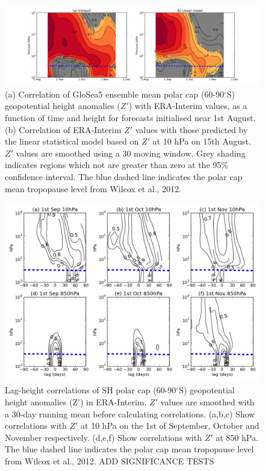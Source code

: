\begin{figure}[htbp]
\centering
\includegraphics{./figures/glosea_linear_corr.png}
\caption{(a) Correlation of GloSea5 ensemble mean polar cap
(60-90$^{\circ}$S) geopotential height anomalies ($Z'$) with ERA-Interim
values, as a function of time and height for forecasts initialised near
1st August. (b) Correlation of ERA-Interim $Z'$ values with those
predicted by the linear statistical model based on $Z'$ at 10 hPa on
15th August. $Z'$ values are smoothed using a 30 moving window. Grey
shading indicates regions which not are greater than zero at the 95\%
confidence interval. The blue dashed line indicates the polar cap mean
tropopause level from Wilcox et al., 2012.}
\end{figure}

\begin{figure}[htbp]
\centering
\includegraphics{./figures/lag_corrs_SH_10hPa.png}
\caption{Lag-height correlations of SH polar cap (60-90$^{\circ}$S)
geopotential height anomalies (Z') in ERA-Interim. $Z'$ values are
smoothed with a 30-day running mean before calculating correlations.
(a,b,c) Show correlations with $Z'$ at 10 hPa on the 1st of September,
October and November respectively. (d,e,f) Show correlations with $Z'$
at 850 hPa. The blue dashed line indicates the polar cap mean tropopause
level from Wilcox et al., 2012. ADD SIGNIFICANCE TESTS}
\end{figure}

